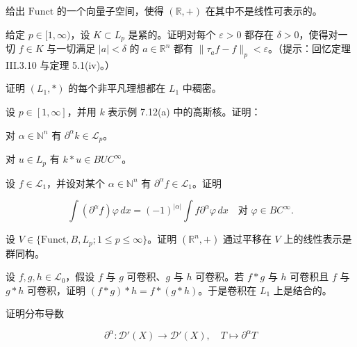 \begin{exercises}
给出 $ \mathrm{Funct} $ 的一个向量子空间，使得 $ (\mathbb{R}, +) $ 在其中不是线性可表示的。

\item

给定 $ p \in [1, \infty) $，设 $ K \subset L_p $ 是紧的。证明对每个 $ \varepsilon > 0 $ 都存在 $ \delta > 0 $，使得对一切 $ f \in K $ 与一切满足 $ |a| < \delta $ 的 $ a \in \mathbb{R}^n $ 都有 $ \|\tau_a f - f\|_p < \varepsilon $。（提示：回忆定理 III.3.10 与定理 5.1(iv)。）

\item

证明 $ (L_1, *) $ 的每个非平凡理想都在 $ L_1 $ 中稠密。

\item

设 $ p \in [1, \infty] $，并用 $ k $ 表示例 7.12(a) 中的高斯核。证明：

\begin{items}
\item

对 $ \alpha \in \mathbb{N}^n $ 有 $ \partial^\alpha k \in \mathcal{L}_p $。

\item

对 $ u \in L_p $ 有 $ k * u \in BUC^\infty $。

\end{items}

\item

设 $ f \in \mathcal{L}_1 $，并设对某个 $ \alpha \in \mathbb{N}^n $ 有 $ \partial^\alpha f \in \mathcal{L}_1 $。证明

\[
\int (\partial^\alpha f) \varphi \, dx = (-1)^{|\alpha|} \int f \partial^\alpha \varphi \, dx \quad \text{对 } \varphi \in BC^\infty .
\]
\item

设 $ V \in \{ \mathrm{Funct}, B, L_p ; 1 \le p \le \infty \} $。证明 $ (\mathbb{R}^n, +) $ 通过平移在 $ V $ 上的线性表示是群同构。

\item

设 $ f, g, h \in \mathcal{L}_0 $，假设 $ f $ 与 $ g $ 可卷积、$ g $ 与 $ h $ 可卷积。若 $ f * g $ 与 $ h $ 可卷积且 $ f $ 与 $ g * h $ 可卷积，证明 $ (f * g) * h = f * (g * h) $。于是卷积在 $ L_1 $ 上是结合的。

\item

证明分布导数

\[
\partial^\alpha : \mathcal{D}'(X) \to \mathcal{D}'(X) , \quad T \mapsto \partial^\alpha T
\]


\end{exercises}
